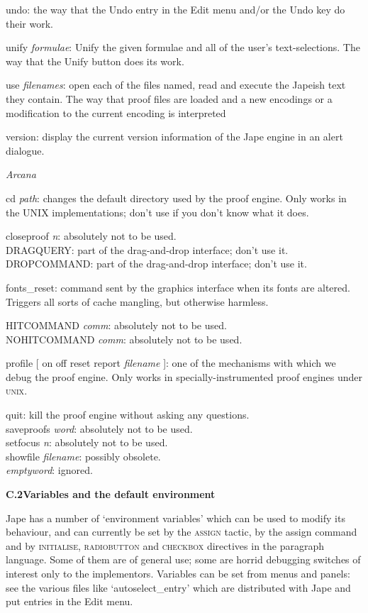 undo: the way that the Undo entry in the Edit menu and/or the Undo key do their work.


unify \textit{formulae}: Unify the given formulae and all of the user's text-selections. The way that the Unify button does its work.


use \textit{filenames}: open each of the files named, read and execute the Japeish text they contain. The way that proof files are loaded and a new encodings or a modification to the current encoding is interpreted


version: display the current version information of the Jape engine in an alert dialogue.


\textit{Arcana}


cd \textit{path}: changes the default directory used by the proof engine. Only works in the UNIX implementations; don't use if you don't know what it does.


closeproof \textit{n}: absolutely not to be used.\\
DRAGQUERY: part of the drag-and-drop interface; don't use it.\\
DROPCOMMAND: part of the drag-and-drop interface; don't use it.


fonts\_reset: command sent by the graphics interface when its fonts are altered. Triggers all sorts of cache mangling, but otherwise harmless.


HITCOMMAND \textit{comm}: absolutely not to be used.\\
NOHITCOMMAND \textit{comm}: absolutely not to be used.


profile [ on {\textbar} off {\textbar} reset {\textbar} report \textit{filename} ]: one of the mechanisms with which we debug the proof engine. Only works in specially-instrumented proof engines under \textsc{unix}.


quit: kill the proof engine without asking any questions.\\
saveproofs \textit{word}: absolutely not to be used.\\
setfocus \textit{n}: absolutely not to be used.\\
showfile \textit{filename}: possibly obsolete.\\
\textit{emptyword}: ignored.


\textbf{{\large C.2\tab Variables and the default environment}}


Jape has a number of `environment variables' which can be used to modify its behaviour, and can currently be set by the \textsc{assign} tactic, by the assign command and by \textsc{initialise, radiobutton} and \textsc{checkbox} directives in the paragraph language. Some of them are of general use; some are horrid debugging switches of interest only to the implementors. Variables can be set from menus and panels: see the various files like `autoselect\_entry' which are distributed with Jape and put entries in the Edit menu.


